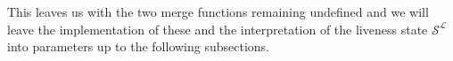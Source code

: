 This leaves us with the two merge functions remaining undefined and we will leave the implementation of these and the interpretation of the 
liveness state $\mathcal{S}^\mathcal{L}$ into parameters up to the following subsections.




